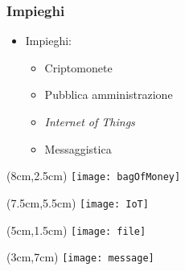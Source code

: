 \begin{frame}
  \frametitle{Impieghi}

  \begin{itemize}
   \item<1-> Impieghi:
   \begin{itemize}
    \item<2-> Criptomonete
    \item<3-> Pubblica amministrazione
    \item<4-> \textit{Internet of Things}
    \item<5-> Messaggistica
   \end{itemize}
  \end{itemize}

 \begin{textblock*}{5cm}(8cm,2.5cm)
  \texttt{[image: bagOfMoney]}
 \end{textblock*}

 \begin{textblock*}{5cm}(7.5cm,5.5cm)
  \texttt{[image: IoT]}
 \end{textblock*}

 \begin{textblock*}{5cm}(5cm,1.5cm)
  \texttt{[image: file]}
 \end{textblock*}

 \begin{textblock*}{5cm}(3cm,7cm)
  \texttt{[image: message]}
 \end{textblock*}

\end{frame}
